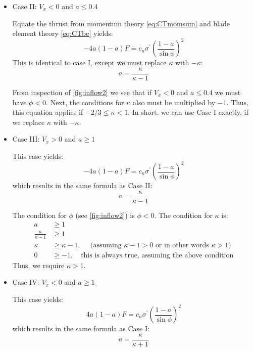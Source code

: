 \begin{itemize}
\item Case II: $V_x < 0$ and $a \le 0.4$

Equate the thrust from momentum theory \cref{eq:CTmomsum} and blade element theory \cref{eq:CTbe} yields:
\begin{equation}
    - 4 a (1 - a) F = c_n \sigma^\prime \left(\frac{1-a}{\sin\phi}\right)^2
\end{equation}
This is identical to case I, except we must replace $\kappa$ with $-\kappa$:
\begin{equation}
    a = \frac{\kappa}{\kappa - 1}
\end{equation}

From inspection of \cref{fig:inflow2} we see that if $V_x < 0$ and $a \le 0.4$ we must have $\phi < 0$.  Next, the conditions for $\kappa$ also must be multiplied by $-1$.  Thus, this equation applies if $-2/3 \le \kappa < 1$.  In short, we can use Case I exactly, if we replace $\kappa$ with $-\kappa$.


\item Case III: $V_x > 0$ and $a \ge 1$

This case yields:
\begin{equation}
    - 4 a (1 - a) F = c_n \sigma^\prime \left(\frac{1-a}{\sin\phi}\right)^2
\end{equation}
which results in the same formula as Case II:
\begin{equation}
    a = \frac{\kappa}{\kappa - 1}
\end{equation}

The condition for $\phi$ (see \cref{fig:inflow2}) is $\phi < 0$.  The condition for $\kappa$ is:
\begin{equation}
    \begin{aligned}
        a &\ge 1\\
        \frac{\kappa}{\kappa -1} &\ge 1\\
        \kappa &\ge \kappa -1,\quad \text{ (assuming $\kappa - 1 > 0$ or in other words $\kappa > 1$)} \\
        0 &\ge -1,\quad \text{this is always true, assuming the above condition}
    \end{aligned}
\end{equation}
Thus, we require $\kappa > 1$.

\item Case IV: $V_x < 0$ and $a \ge 1$

This case yields:
\begin{equation}
    4 a (1 - a) F = c_n \sigma^\prime \left(\frac{1-a}{\sin\phi}\right)^2
\end{equation}
which results in the same formula as Case I:
\begin{equation}
    a = \frac{\kappa}{\kappa + 1}
\end{equation}


\end{itemize}
